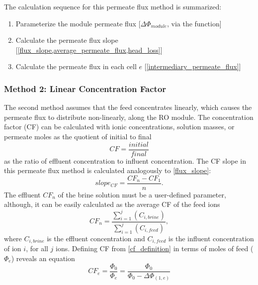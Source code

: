 The calculation sequence for this permeate flux method is summarized:
\begin{enumerate}
    \item Parameterize the module permeate flux [$\Delta \Phi_{module}$, via the  function]
    \item Calculate the permeate flux slope [\cref{flux_slope,average_permeate_flux,head_loss}]
    \item Calculate the permeate flux in each cell $e$ [\cref{intermediary_permeate_flux}]
\end{enumerate}


\subsubsection{Method 2: Linear Concentration Factor}
The second method assumes that the feed concentrates linearly, which causes the permeate flux to distribute non-linearly, along the RO module. The concentration factor (CF) \cite{McCaffrey1987TheHalite.,Casas2012SeawaterElectrodialysis,Kartashevsky2015PhosphateEffluents,Yan2017ReverseVelocity} can be calculated with ionic concentrations, solution masses, or permeate moles as the quotient of initial to final  \cite{Casas2012SeawaterElectrodialysis,Yan2017ReverseVelocity}
\begin{equation} \label{cf_definition}
    CF = \frac{initial}{final}
\end{equation}
as the ratio of effluent concentration to influent concentration. The CF slope in this permeate flux method is calculated analogously to \cref{flux_slope}:
\begin{equation} \label{average_cf_slope}
    slope_{CF} =\frac{CF_{n}-CF_1}{n}.
\end{equation}
The effluent $CF_{n}$ of the brine solution must be a user-defined parameter, although, it can be easily calculated as the average CF of the feed ions 
\begin{equation} \label{cf_calculation_output}
    CF_{n}=\frac{\sum_{i=1}^j(C_{i,brine})}{\sum_{i=1}^j(C_{i,feed})},
\end{equation}
where $C_{i,brine}$ is the effluent concentration and $C_{i,feed}$ is the influent concentration of ion $i$, for all $j$ ions. Defining CF from \cref{cf_definition} in terms of moles of feed ($\Phi_e$) reveals an equation 
\begin{equation} \label{cf_cell_definition}
    CF_e=\frac{\Phi_0}{\Phi_e}=\frac{\Phi_0}{\Phi_0-\Delta \Phi_{(1,e)}}
\end{equation}
